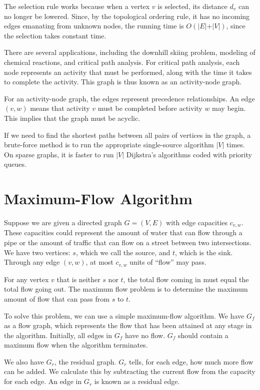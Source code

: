 The selection rule works because when a vertex \(v\) is selected, its distance \(d_v\) can no longer be lowered. Since, by the topological ordering rule, it has no incoming edges emanating from unknown nodes, the running time is \(O(\vert E \vert + \vert V \vert)\), since the selection takes constant time.

There are several applications, including the downhill skiing problem, modeling of chemical reactions, and critical path analysis. For critical path analysis, each node represents an activity that must be performed, along with the time it takes to complete the activity. This graph is thus known as an activity-node graph.

For an activity-node graph, the edges represent precedence relationships. An edge \((v, w)\) means that activity \(v\) must be completed before activity \(w\) may begin. This implies that the graph must be acyclic.

If we need to find the shortest paths between all pairs of vertices in the graph, a brute-force method is to run the appropriate single-source algorithm \(\vert V \vert\) times. On sparse graphs, it is faster to run \(\vert V \vert\) Dijkstra's algorithms coded with priority queues.

\section{Maximum-Flow Algorithm}
Suppose we are given a directed graph \(G = (V, E)\) with edge capacities \(c_{v, w}\). These capacities could represent the amount of water that can flow through a pipe or the amount of traffic that can flow on a street between two intersections. We have two vertices: \(s\), which we call the source, and \(t\), which is the sink. Through any edge \((v, w)\), at most \(c_{v, w}\) units of ``flow'' may pass.

For any vertex \(v\) that is neither \(s\) nor \(t\), the total flow coming in must equal the total flow going out. The maximum flow problem is to determine the maximum amount of flow that can pass from \(s\) to \(t\).

To solve this problem, we can use a simple maximum-flow algorithm. We have \(G_f\) as a flow graph, which represents the flow that has been attained at any stage in the algorithm. Initially, all edges in \(G_f\) have no flow. \(G_f\) should contain a maximum flow when the algorithm terminates.

We also have \(G_r\), the residual graph. \(G_r\) tells, for each edge, how much more flow can be added. We calculate this by subtracting the current flow from the capacity for each edge. An edge in \(G_r\) is known as a residual edge.

